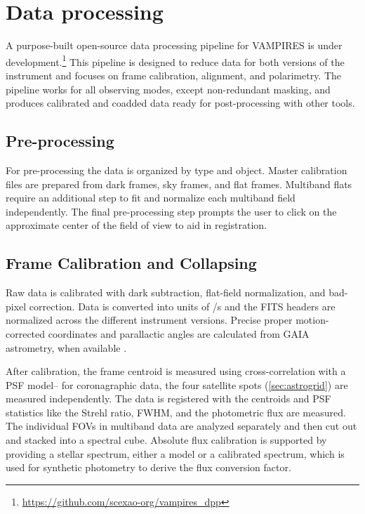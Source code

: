 \section{Data processing}\label{sec:processing}

A purpose-built open-source data processing pipeline for VAMPIRES is under development.\footnote{\url{https://github.com/scexao-org/vampires_dpp}} This pipeline is designed to reduce data for both versions of the instrument and focuses on frame calibration, alignment, and polarimetry. The pipeline works for all observing modes, except non-redundant masking, and produces calibrated and coadded data ready for post-processing with other tools.

\subsection{Pre-processing}
For pre-processing the data is organized by type and object. Master calibration files are prepared from dark frames, sky frames, and flat frames. Multiband flats require an additional step to fit and normalize each multiband field independently. The final pre-processing step prompts the user to click on the approximate center of the field of view to aid in registration.

\subsection{Frame Calibration and Collapsing}

Raw data is calibrated with dark subtraction, flat-field normalization, and bad-pixel correction. Data is converted into units of \si{\electron/\second} and the FITS headers are normalized across the different instrument versions. Precise proper motion-corrected coordinates and parallactic angles are calculated from GAIA astrometry, when available \citep{gaia_collaboration_gaia_2016,gaia_collaboration_gaia_2018,gaia_collaboration_gaia_2021}.

After calibration, the frame centroid is measured using cross-correlation with a PSF model-- for coronagraphic data, the four satellite spots (\autoref{sec:astrogrid}) are measured independently.  The data is registered with the centroids and PSF statistics like the Strehl ratio, FWHM, and the photometric flux are measured. The individual FOVs in multiband data are analyzed separately and then cut out and stacked into a spectral cube. Absolute flux calibration is supported by providing a stellar spectrum, either a model or a calibrated spectrum, which is used for synthetic photometry to derive the flux conversion factor.


